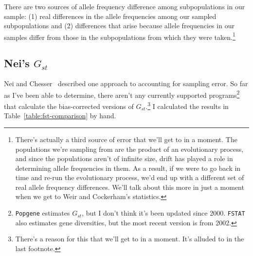 \documentclass[12pt]{article}
\begin{document}
There are two sources of allele frequency difference among
subpopulations in our sample: (1) real differences in the allele
frequencies among our sampled subpopulations and (2) differences that
arise because allele frequencies in our samples differ from those in
the subpopulations from which they were taken.\footnote{There's
  actually a third source of error that we'll get to in a moment. The
  populations we're sampling from are the product of an evolutionary
  process, and since the populations aren't of infinite size, drift
  has played a role in determining allele frequencies in them. As a
  result, if we were to go back in time and re-run the evolutionary
  process, we'd end up with a different set of real allele frequency
  differences. We'll talk about this more in just a moment when we get
  to Weir and Cockerham's statistics.}

\subsection*{Nei's $G_{st}$}

Nei and Chesser~\cite{Nei-Chesser-1983} described one approach to
accounting for sampling error. So far as I've been able to determine,
there aren't any currently supported programs\footnote{{\tt Popgene}
  estimates $G_{st}$, but I don't think it's been updated since
  2000. {\tt FSTAT} also estimates gene diversities, but the most
  recent version is from 2002.}
that calculate the bias-corrected versions of
$G_{st}$.\footnote{There's a reason for this that we'll get to in a
  moment. It's alluded to in the last footnote.} I calculated the
results in Table~\ref{table:fst-comparison} by hand.
\end{document}
